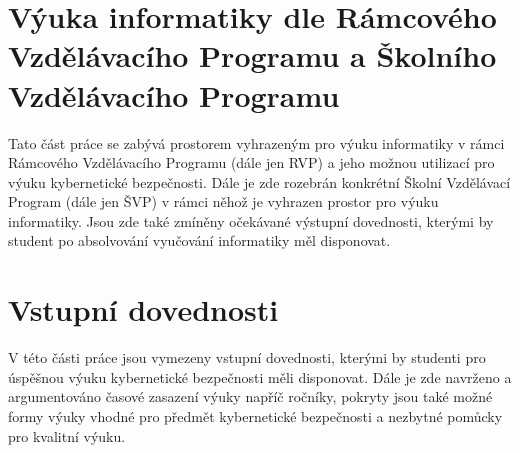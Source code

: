 \documentclass[a4paper, 12pt]{article}
\begin{document}
\newpage
\section{Výuka informatiky dle Rámcového Vzdělávacího Programu a Školního Vzdělávacího Programu}
Tato část práce se zabývá prostorem vyhrazeným pro výuku informatiky v rámci Rámcového Vzdělávacího Programu (dále jen RVP) a jeho možnou utilizací pro výuku kybernetické bezpečnosti. Dále je zde rozebrán konkrétní Školní Vzdělávací Program (dále jen ŠVP) v rámci něhož je vyhrazen prostor pro výuku informatiky. Jsou zde také zmíněny očekávané výstupní dovednosti, kterými by student po absolvování vyučování informatiky měl disponovat.

\newpage
\section{Vstupní dovednosti}
V této části práce jsou vymezeny vstupní dovednosti, kterými by studenti pro úspěšnou výuku kybernetické bezpečnosti měli disponovat. Dále je zde navrženo a argumentováno časové zasazení výuky napříč ročníky, pokryty jsou také možné formy výuky vhodné pro předmět kybernetické bezpečnosti a nezbytné pomůcky pro kvalitní výuku.
\end{document}

